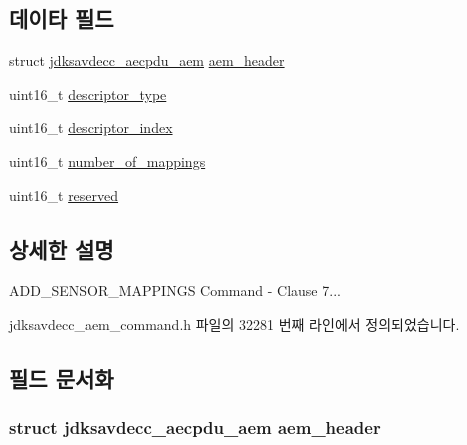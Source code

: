 \subsection*{데이타 필드}
\begin{DoxyCompactItemize}
\item 
struct \hyperlink{structjdksavdecc__aecpdu__aem}{jdksavdecc\+\_\+aecpdu\+\_\+aem} \hyperlink{structjdksavdecc__aem__command__add__sensor__mappings_ae1e77ccb75ff5021ad923221eab38294}{aem\+\_\+header}
\item 
uint16\+\_\+t \hyperlink{structjdksavdecc__aem__command__add__sensor__mappings_ab7c32b6c7131c13d4ea3b7ee2f09b78d}{descriptor\+\_\+type}
\item 
uint16\+\_\+t \hyperlink{structjdksavdecc__aem__command__add__sensor__mappings_a042bbc76d835b82d27c1932431ee38d4}{descriptor\+\_\+index}
\item 
uint16\+\_\+t \hyperlink{structjdksavdecc__aem__command__add__sensor__mappings_ac7db472c5622ef473d5d0a5c416d5531}{number\+\_\+of\+\_\+mappings}
\item 
uint16\+\_\+t \hyperlink{structjdksavdecc__aem__command__add__sensor__mappings_a5a6ed8c04a3db86066924b1a1bf4dad3}{reserved}
\end{DoxyCompactItemize}


\subsection{상세한 설명}
A\+D\+D\+\_\+\+S\+E\+N\+S\+O\+R\+\_\+\+M\+A\+P\+P\+I\+N\+GS Command -\/ Clause 7... 

jdksavdecc\+\_\+aem\+\_\+command.\+h 파일의 32281 번째 라인에서 정의되었습니다.



\subsection{필드 문서화}
\subsubsection[{\texorpdfstring{aem\+\_\+header}{aem_header}}]{\setlength{\rightskip}{0pt plus 5cm}struct {\bf jdksavdecc\+\_\+aecpdu\+\_\+aem} aem\+\_\+header}\hypertarget{structjdksavdecc__aem__command__add__sensor__mappings_ae1e77ccb75ff5021ad923221eab38294}{}\label{structjdksavdecc__aem__command__add__sensor__mappings_ae1e77ccb75ff5021ad923221eab38294}


